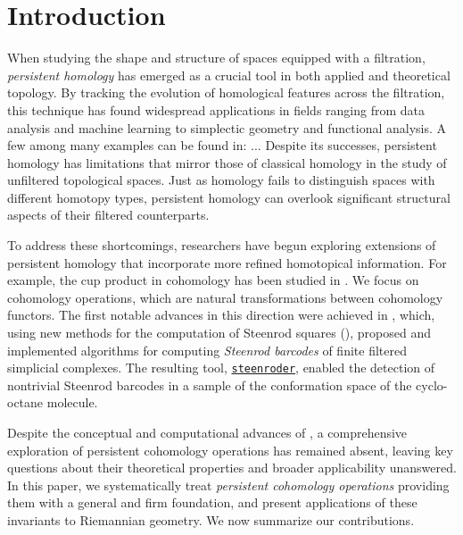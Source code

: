 
\section{Introduction} \label{s:introduction}

When studying the shape and structure of spaces equipped with a filtration, \textit{persistent homology} has emerged as a crucial tool in both applied and theoretical topology.
By tracking the evolution of homological features across the filtration, this technique has found widespread applications in fields ranging from data analysis and machine learning to simplectic geometry and functional analysis.
A few among many examples can be found in: ... 
Despite its successes, persistent homology has limitations that mirror those of classical homology in the study of unfiltered topological spaces.
Just as homology fails to distinguish spaces with different homotopy types, persistent homology can overlook significant structural aspects of their filtered counterparts.

To address these shortcomings, researchers have begun exploring extensions of persistent homology that incorporate more refined homotopical information.
For example, the cup product in cohomology has been studied in \cite{contessoto_et_al:LIPIcs.SoCG.2022.31, memoli2024persistent, huang2005cup, yarmola2010persistence, herscovich2018higher, belchi2021a, contreras2022persistent}.
We focus on cohomology operations, which are natural transformations between cohomology functors.
The first notable advances in this direction were achieved in \cite{medina2022per_st}, which, using new methods for the computation of Steenrod squares (\cite{medina2023fast_sq}), proposed and implemented algorithms for computing \textit{Steenrod barcodes} of finite filtered simplicial complexes.
The resulting tool, \href{https://steenroder.github.io/steenroder/}{\texttt{steenroder}}, enabled the detection of nontrivial Steenrod barcodes in a sample of the conformation space of the cyclo-octane molecule.

Despite the conceptual and computational advances of \cite{medina2022per_st}, a comprehensive exploration of persistent cohomology operations has remained absent, leaving key questions about their theoretical properties and broader applicability unanswered.
In this paper, we systematically treat \textit{persistent cohomology operations} providing them with a general and firm foundation, and present applications of these invariants to Riemannian geometry.
We now summarize our contributions.

